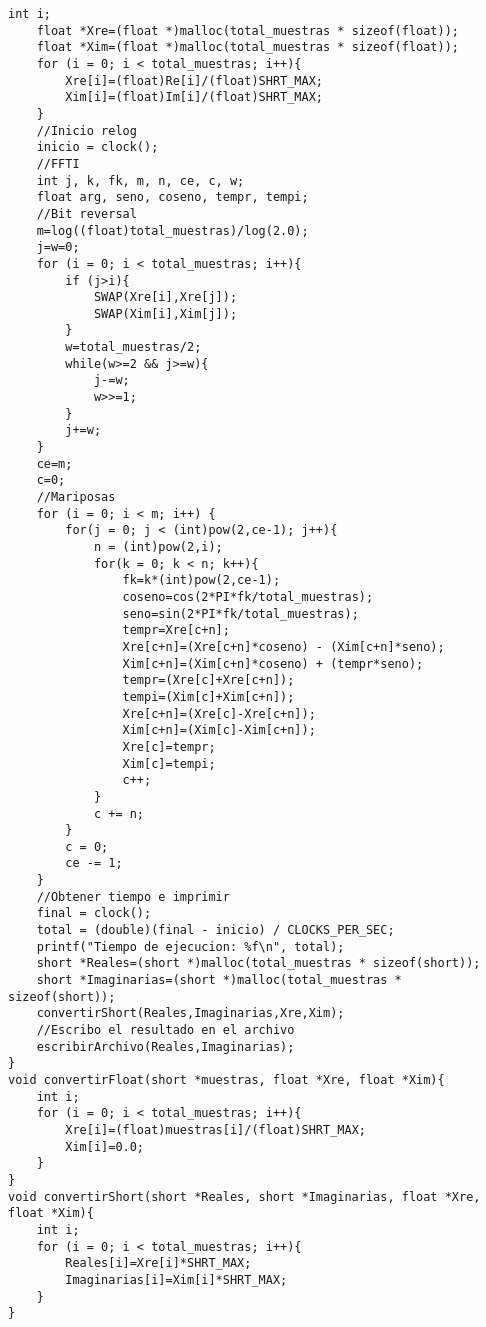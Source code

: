 \begin{lstlisting}[style=CStyle]
	int i;
	float *Xre=(float *)malloc(total_muestras * sizeof(float));
	float *Xim=(float *)malloc(total_muestras * sizeof(float));
	for (i = 0; i < total_muestras; i++){
		Xre[i]=(float)Re[i]/(float)SHRT_MAX;
		Xim[i]=(float)Im[i]/(float)SHRT_MAX;
	}
	//Inicio relog
	inicio = clock();
	//FFTI
	int j, k, fk, m, n, ce, c, w;
	float arg, seno, coseno, tempr, tempi;
	//Bit reversal
	m=log((float)total_muestras)/log(2.0);
	j=w=0;
	for (i = 0; i < total_muestras; i++){
		if (j>i){
			SWAP(Xre[i],Xre[j]);
			SWAP(Xim[i],Xim[j]);
		}
		w=total_muestras/2;
		while(w>=2 && j>=w){
			j-=w;
			w>>=1;
		}
		j+=w;
	}
	ce=m;
	c=0;
	//Mariposas
	for (i = 0; i < m; i++) {
		for(j = 0; j < (int)pow(2,ce-1); j++){
			n = (int)pow(2,i);
			for(k = 0; k < n; k++){
				fk=k*(int)pow(2,ce-1);
				coseno=cos(2*PI*fk/total_muestras);
				seno=sin(2*PI*fk/total_muestras);
				tempr=Xre[c+n];
				Xre[c+n]=(Xre[c+n]*coseno) - (Xim[c+n]*seno);
				Xim[c+n]=(Xim[c+n]*coseno) + (tempr*seno);
				tempr=(Xre[c]+Xre[c+n]);
				tempi=(Xim[c]+Xim[c+n]);
				Xre[c+n]=(Xre[c]-Xre[c+n]);
				Xim[c+n]=(Xim[c]-Xim[c+n]);
				Xre[c]=tempr;
				Xim[c]=tempi;
				c++;
			}
			c += n;
		}
		c = 0;
		ce -= 1;
	}
	//Obtener tiempo e imprimir
	final = clock();
	total = (double)(final - inicio) / CLOCKS_PER_SEC;
	printf("Tiempo de ejecucion: %f\n", total);
	short *Reales=(short *)malloc(total_muestras * sizeof(short));
	short *Imaginarias=(short *)malloc(total_muestras * sizeof(short));
	convertirShort(Reales,Imaginarias,Xre,Xim);
	//Escribo el resultado en el archivo
	escribirArchivo(Reales,Imaginarias);
}
void convertirFloat(short *muestras, float *Xre, float *Xim){
	int i;
	for (i = 0; i < total_muestras; i++){
		Xre[i]=(float)muestras[i]/(float)SHRT_MAX;
		Xim[i]=0.0;
	}
}
void convertirShort(short *Reales, short *Imaginarias, float *Xre, float *Xim){
	int i;
	for (i = 0; i < total_muestras; i++){
		Reales[i]=Xre[i]*SHRT_MAX;
		Imaginarias[i]=Xim[i]*SHRT_MAX;
	}
}
\end{lstlisting}
